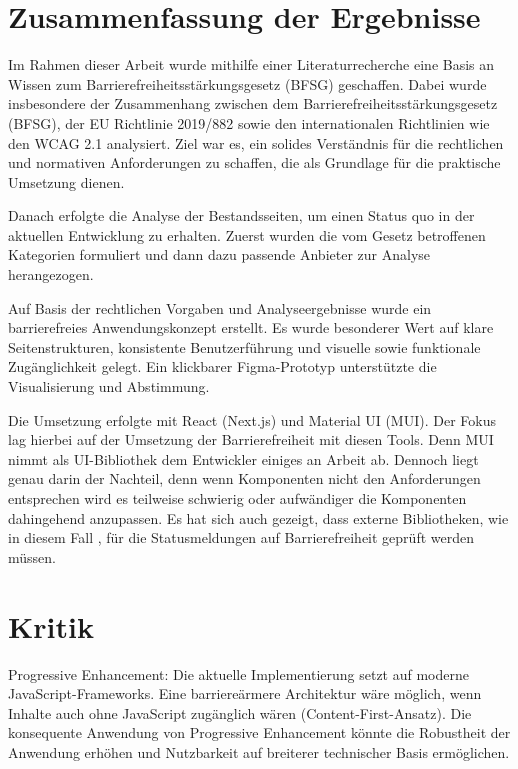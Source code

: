\section{Zusammenfassung der Ergebnisse}
Im Rahmen dieser Arbeit wurde mithilfe einer Literaturrecherche eine Basis an Wissen zum Barrierefreiheitsstärkungsgesetz (BFSG) geschaffen. Dabei wurde insbesondere der Zusammenhang zwischen dem Barrierefreiheitsstärkungsgesetz (BFSG), der EU Richtlinie 2019/882 sowie den internationalen Richtlinien wie den WCAG 2.1 analysiert. Ziel war es, ein solides Verständnis für die rechtlichen und normativen Anforderungen zu schaffen, die als Grundlage für die praktische Umsetzung dienen.

Danach erfolgte die Analyse der Bestandsseiten, um einen Status quo in der aktuellen Entwicklung zu erhalten. Zuerst wurden die vom Gesetz betroffenen Kategorien formuliert und dann dazu passende Anbieter zur Analyse herangezogen.

Auf Basis der rechtlichen Vorgaben und Analyseergebnisse wurde ein barrierefreies Anwendungskonzept erstellt. Es wurde besonderer Wert auf klare Seitenstrukturen, konsistente Benutzerführung und visuelle sowie funktionale Zugänglichkeit gelegt. Ein klickbarer Figma-Prototyp unterstützte die Visualisierung und Abstimmung.

Die Umsetzung erfolgte mit React (Next.js) und Material UI (MUI). Der Fokus lag hierbei auf der Umsetzung der Barrierefreiheit mit diesen Tools. Denn MUI nimmt als UI-Bibliothek dem Entwickler einiges an Arbeit ab. Dennoch liegt genau darin der Nachteil, denn wenn Komponenten nicht den Anforderungen entsprechen wird es teilweise schwierig oder aufwändiger die Komponenten dahingehend anzupassen. Es hat sich auch gezeigt, dass externe Bibliotheken, wie in diesem Fall , für die Statusmeldungen auf Barrierefreiheit geprüft werden müssen.

\section{Kritik}

Progressive Enhancement: Die aktuelle Implementierung setzt auf moderne JavaScript-Frameworks. Eine barriereärmere Architektur wäre möglich, wenn Inhalte auch ohne JavaScript zugänglich wären (Content-First-Ansatz). Die konsequente Anwendung von Progressive Enhancement könnte die Robustheit der Anwendung erhöhen und Nutzbarkeit auf breiterer technischer Basis ermöglichen.


